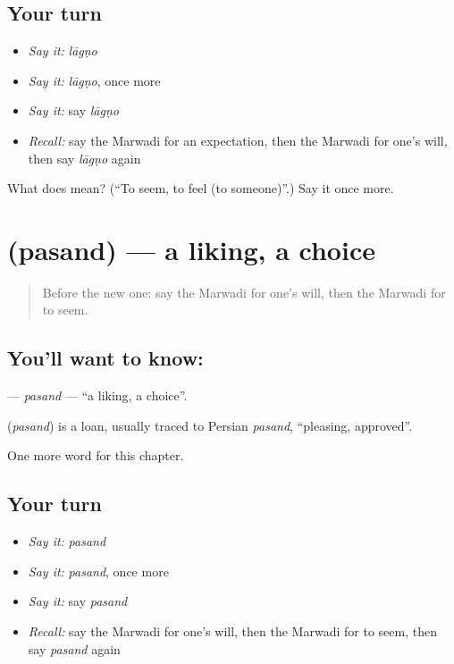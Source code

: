 \subsection*{Your turn}
\begin{itemize}
\raggedright
  \item \emph{Say it:} \emph{lāgṇo}
  \item \emph{Say it:} \emph{lāgṇo}, once more
  \item \emph{Say it:} say \emph{lāgṇo}
  \item \emph{Recall:} say the Marwadi for an expectation, then the Marwadi for one's will, then say \emph{lāgṇo} again
\end{itemize}

\begin{tcolorbox}[breakable,colback=teal!4,colframe=teal!35!black,title={Before you move on}]
What does  mean? (\textquotedblleft{}To seem, to feel (to someone)\textquotedblright{}.) Say it once more.
\end{tcolorbox}
\section[\texorpdfstring{\mw{पसंद} (pasand)}{पसंद (pasand)}]{ (pasand) — a liking, a choice}

\label{lesson:MW-C113-pasand}



\begin{quote}
Before the new one: say the Marwadi for one's will, then the Marwadi for to seem.
\end{quote}

\subsection*{You'll want to know: }
\textbf{} — \emph{pasand} — \textquotedblleft{}a liking, a choice\textquotedblright{}.

\begin{cousinweb}
\textbf{} (\emph{pasand}) is a loan, usually traced to Persian \emph{pasand}, \textquotedblleft{}pleasing, approved\textquotedblright{}.
\end{cousinweb}

\begin{grammarlens}[title={What you've built}]
One more word for this chapter.
\end{grammarlens}

\subsection*{Your turn}
\begin{itemize}
\raggedright
  \item \emph{Say it:} \emph{pasand}
  \item \emph{Say it:} \emph{pasand}, once more
  \item \emph{Say it:} say \emph{pasand}
  \item \emph{Recall:} say the Marwadi for one's will, then the Marwadi for to seem, then say \emph{pasand} again
\end{itemize}

